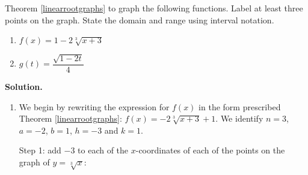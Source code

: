 \documentclass{ximera}
\begin{document}
\begin{example} \label{rootshifts}  Theorem \ref{linearrootgraphs} to graph the following functions.  Label at least three points on the graph.  State the domain and range using interval notation.

\begin{multicols}{2}

\begin{enumerate}

\item $f(x) =  1 -2 \sqrt[3]{x+3}$ 


\item  $g(t) = \dfrac{\sqrt{1-2t}}{4}$


\end{enumerate}

\end{multicols}

{\bf Solution.}

\begin{enumerate}

\item  We begin by rewriting the expression for $f(x)$ in the form prescribed Theorem \ref{linearrootgraphs}:  $f(x) = -2 \sqrt[3]{x+3} + 1$.  We identify $n=3$, $a = -2$, $b = 1$, $h = -3$ and $k = 1$.  

Step 1:   add $-3$ to each of the $x$-coordinates of each of the points on the graph of $y=\sqrt[3]{x}$:









\end{enumerate}
\end{example}
\end{document}
